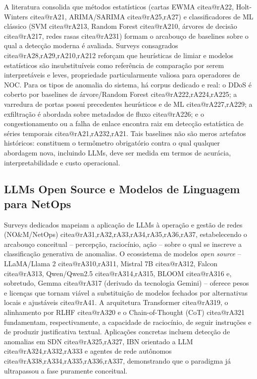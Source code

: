\documentclass[12pt,a4paper]{article}
\makeatletter
\newcommand{\citea}[1]{\begingroup\edef\@currentlabel{\csname citea@#1\endcsname}\@currentlabel\endgroup}
\makeatother
\begin{document}
A literatura consolida que métodos estatísticos (cartas EWMA \citea{rA22},
Holt-Winters \citea{rA21}, ARIMA/SARIMA \citea{rA25,rA27}) e classificadores de
ML clássico (SVM \citea{rA213}, Random Forest \citea{rA210}, árvores de
decisão \citea{rA217}, redes rasas \citea{rA231}) formam o arcabouço de
baselines sobre o qual a detecção moderna é avaliada. Surveys consagrados
\citea{rA28,rA29,rA210,rA212} reforçam que heurísticas de limiar e modelos
estatísticos são insubstituíveis como referência de comparação por serem
interpretáveis e leves, propriedade particularmente valiosa para operadores
de NOC. Para os tipos de anomalia do sistema, há corpus dedicado e real: o
DDoS é coberto por baselines de árvore/Random Forest \citea{rA222,rA224,rA225};
a varredura de portas possui precedentes heurísticos e de ML
\citea{rA227,rA229}; a exfiltração é abordada sobre metadados de fluxo
\citea{rA226}; e o congestionamento ou a falha de enlace encontra raiz em
detecção estatística de séries temporais \citea{rA21,rA232,rA21}. Tais
baselines não são meros artefatos históricos: constituem o termômetro
obrigatório contra o qual qualquer abordagem nova, incluindo LLMs, deve ser
medida em termos de acurácia, interpretabilidade e custo operacional.

\subsection{LLMs Open Source e Modelos de Linguagem para NetOps}
\label{sec:llm}

Surveys dedicados mapeiam a aplicação de LLMs à operação e gestão de redes
(NO\&M/NetOps) \citea{rA31,rA32,rA33,rA34,rA35,rA36,rA37}, estabelecendo o
arcabouço conceitual -- percepção, raciocínio, ação -- sobre o qual se
inscreve a classificação generativa de anomalias. O ecossistema de modelos
\textit{open source} -- LLaMA/Llama 2 \citea{rA310,rA311}, Mistral 7B
\citea{rA312}, Falcon \citea{rA313}, Qwen/Qwen2.5 \citea{rA314,rA315}, BLOOM
\citea{rA316} e, sobretudo, Gemma \citea{rA317} (derivado da tecnologia
Gemini) -- oferece pesos e licenças que tornam viável a substituição de
modelos fechados por alternativas locais e ajustáveis \citea{rA41}. A
arquitetura Transformer \citea{rA319}, o alinhamento por RLHF \citea{rA320} e o
Chain-of-Thought (CoT) \citea{rA321} fundamentam, respectivamente, a
capacidade de raciocínio, de seguir instruções e de produzir justificativa
textual. Aplicações concretas incluem detecção de anomalias em SDN
\citea{rA325,rA327}, IBN orientado a LLM \citea{rA324,rA332,rA333} e agentes de
rede autônomos \citea{rA338,rA334,rA335,rA336,rA337}, demonstrando que o
paradigma já ultrapassou a fase puramente conceitual.
\end{document}
